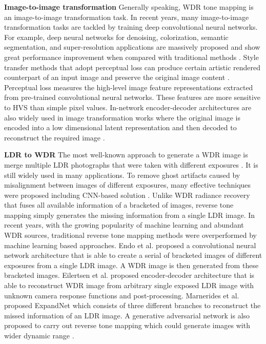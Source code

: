 \documentclass[journal]{IEEEtran}
\begin{document}
\textbf{Image-to-image transformation} Generally speaking, WDR tone mapping is an image-to-image transformation task. In recent years, many image-to-image transformation tasks are tackled by training deep convolutional neural networks. For example, deep neural networks for denoising, colorization, semantic segmentation, and super-resolution applications are massively proposed and show great performance improvement when compared with traditional methods \cite{zhang2017beyond,dong2016image,ronneberger2015u,zhang2016colorful}. Style transfer methods that adopt perceptual loss can produce certain artistic rendered counterpart of an input image and preserve the original image content \cite{johnson2016perceptual,gatys2016image}. Perceptual loss measures the high-level image feature representations extracted from pre-trained convolutional neural networks. These features are more sensitive to HVS than simple pixel values. 
In-network encoder-decoder architectures are also widely used in image transformation works where the original image is encoded into a low dimensional latent representation and then decoded to reconstruct the required image \cite{ronneberger2015u,noh2015learning,long2015fully,tsai2017deep}.

\textbf{LDR to WDR} The most well-known approach to generate a WDR image is merge
multiple LDR photographs that were taken with different exposures \cite{debevec1997recovering}. It is still widely used in many applications. To remove ghost artifacts caused by misalignment between images of different exposures, many effective techniques were proposed \cite{heo2010ghost,lee2014ghost,sen2012robust} including CNN-based solution \cite{wu2018deep}. Unlike WDR radiance recovery that fuses all available information of a bracketed of images, reverse tone mapping simply generates the missing information from a single LDR image. In recent years, with the growing popularity of machine learning and abundant WDR sources, traditional reverse tone mapping methods \cite{banterle2006inverse,rempel2007ldr2hdr,kovaleski2009high,wang2015pseudo} were overperformed by machine learning based approaches. Endo et al. \cite{endo2017deep} proposed a convolutional neural network architecture that is able to create a serial of bracketed images of different exposures from a single LDR image. A WDR image is then generated from these bracketed images. 
 Eilertsen et al. \cite{eilertsen2017hdr} proposed encoder-decoder architecture that is able to reconstruct WDR image from arbitrary single exposed LDR image with unknown camera response functions and post-processing.
Marnerides et al. \cite{marnerides2018expandnet} proposed ExpandNet which consists of three different branches to reconstruct the missed information of an LDR image. A generative adversarial network is also proposed to carry out reverse tone mapping which could generate images with wider dynamic range \cite{lee2018deep}. 
\end{document}
